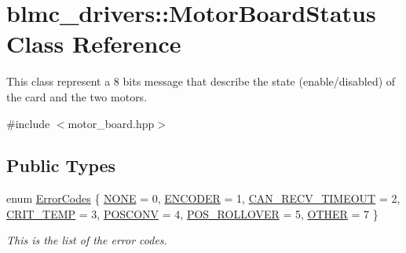 \hypertarget{classblmc__drivers_1_1MotorBoardStatus}{}\section{blmc\+\_\+drivers\+:\+:Motor\+Board\+Status Class Reference}
\label{classblmc__drivers_1_1MotorBoardStatus}


This class represent a 8 bits message that describe the state (enable/disabled) of the card and the two motors.  




{\ttfamily \#include $<$motor\+\_\+board.\+hpp$>$}

\subsection*{Public Types}
\begin{DoxyCompactItemize}
\item 
enum \hyperlink{classblmc__drivers_1_1MotorBoardStatus_a9fd931e24550f5e5877d7a6cf499f6cf}{Error\+Codes} \{ \newline
\hyperlink{classblmc__drivers_1_1MotorBoardStatus_a9fd931e24550f5e5877d7a6cf499f6cfa99d623b3894cfb91a0626b56d0583f84}{N\+O\+NE} = 0, 
\hyperlink{classblmc__drivers_1_1MotorBoardStatus_a9fd931e24550f5e5877d7a6cf499f6cfab3a0b4c22659f24593503e41fce561d0}{E\+N\+C\+O\+D\+ER} = 1, 
\hyperlink{classblmc__drivers_1_1MotorBoardStatus_a9fd931e24550f5e5877d7a6cf499f6cfa25dd0ce676d69449a6fe0a02fa6e6a5d}{C\+A\+N\+\_\+\+R\+E\+C\+V\+\_\+\+T\+I\+M\+E\+O\+UT} = 2, 
\hyperlink{classblmc__drivers_1_1MotorBoardStatus_a9fd931e24550f5e5877d7a6cf499f6cfa43b0778d39a1aa2c193e2b511f2fe511}{C\+R\+I\+T\+\_\+\+T\+E\+MP} = 3, 
\newline
\hyperlink{classblmc__drivers_1_1MotorBoardStatus_a9fd931e24550f5e5877d7a6cf499f6cfa3134cc4a15dfbbeccd1305ad7f0e56cf}{P\+O\+S\+C\+O\+NV} = 4, 
\hyperlink{classblmc__drivers_1_1MotorBoardStatus_a9fd931e24550f5e5877d7a6cf499f6cfa87717db1d2ce92549a0bd95890c45f63}{P\+O\+S\+\_\+\+R\+O\+L\+L\+O\+V\+ER} = 5, 
\hyperlink{classblmc__drivers_1_1MotorBoardStatus_a9fd931e24550f5e5877d7a6cf499f6cfa2b6b3fa06a4bf24105805b604aff7280}{O\+T\+H\+ER} = 7
 \}\begin{DoxyCompactList}\small\item\em This is the list of the error codes. \end{DoxyCompactList}
\end{DoxyCompactItemize}
